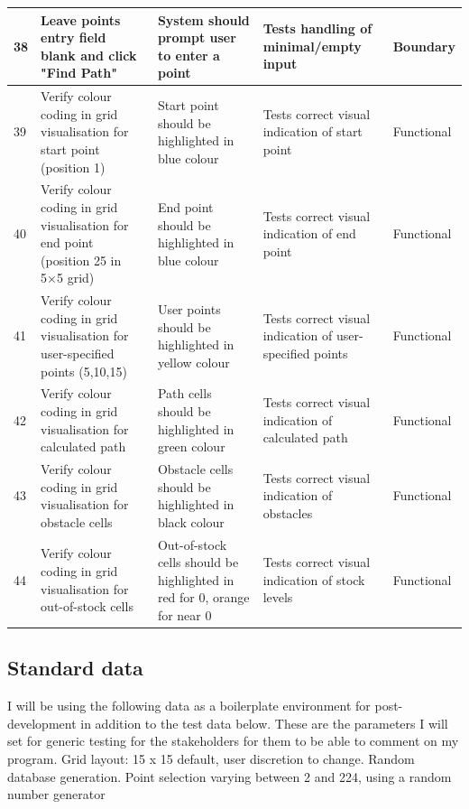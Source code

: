 \begin{longtable}{|p{}|p{}|p{}|p{}|p{}|}
	\hline
	38 & Leave points entry field blank and click "Find Path" & System should prompt user to enter a point & Tests handling of minimal/empty input & Boundary \\
	\hline
	39 & Verify colour coding in grid visualisation for start point (position 1) & Start point should be highlighted in blue colour & Tests correct visual indication of start point & Functional\\
	\hline
	40 & Verify colour coding in grid visualisation for end point (position 25 in 5×5 grid) & End point should be highlighted in blue colour & Tests correct visual indication of end point & Functional \\
	\hline
	41 & Verify colour coding in grid visualisation for user-specified points (5,10,15) & User points should be highlighted in yellow colour & Tests correct visual indication of user-specified points & Functional \\
	\hline
	42 & Verify colour coding in grid visualisation for calculated path & Path cells should be highlighted in green colour & Tests correct visual indication of calculated path & Functional \\
	\hline
	43 & Verify colour coding in grid visualisation for obstacle cells & Obstacle cells should be highlighted in black colour & Tests correct visual indication of obstacles & Functional \\
	\hline
	44 & Verify colour coding in grid visualisation for out-of-stock cells & Out-of-stock cells should be highlighted in red for 0, orange for near 0 & Tests correct visual indication of stock levels & Functional \\
	\hline
\end{longtable}

\subsection{Standard data}

I will be using the following data as a boilerplate environment for post-development in addition to the test data below. These are the parameters I will set for generic testing for the stakeholders for them to be able to comment on my program. Grid layout: 15 x 15 default, user discretion to change. Random database generation. Point selection varying between 2 and 224, using a random number generator